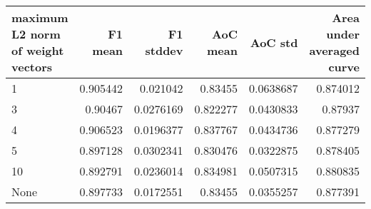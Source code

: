 \begin{tabular}{lrrrrr}
\toprule
 maximum L2 norm of weight vectors   &   F1 mean &   F1 stddev &   AoC mean &   AoC std &   Area under averaged curve \\
\midrule
 1                                   &  0.905442 &   0.021042  &   0.83455  & 0.0638687 &                    0.874012 \\
 3                                   &  0.90467  &   0.0276169 &   0.822277 & 0.0430833 &                    0.87937  \\
 4                                   &  0.906523 &   0.0196377 &   0.837767 & 0.0434736 &                    0.877279 \\
 5                                   &  0.897128 &   0.0302341 &   0.830476 & 0.0322875 &                    0.878405 \\
 10                                  &  0.892791 &   0.0236014 &   0.834981 & 0.0507315 &                    0.880835 \\
 None                                &  0.897733 &   0.0172551 &   0.83455  & 0.0355257 &                    0.877391 \\
\bottomrule
\end{tabular}